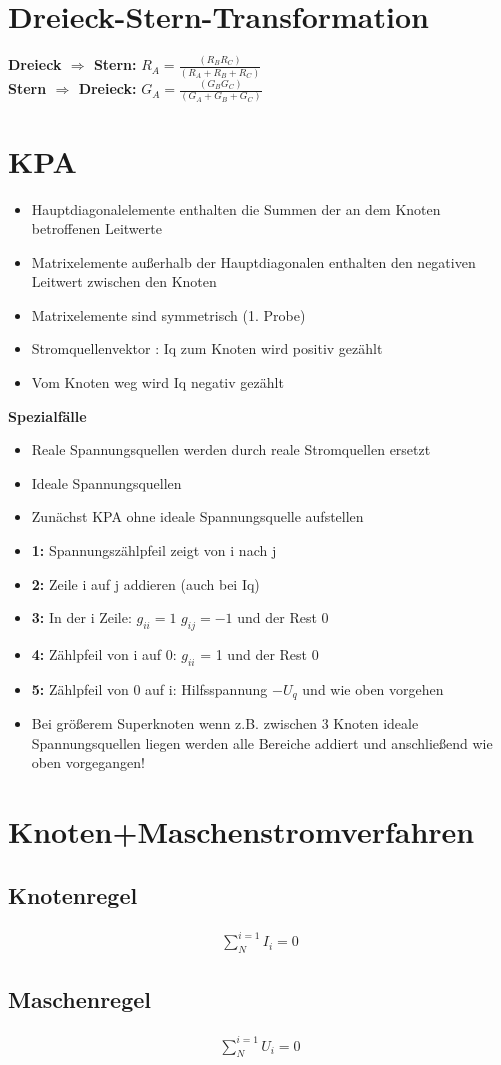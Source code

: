 \documentclass[10pt,a5paper]{article}
\begin{document}
\section{Dreieck-Stern-Transformation}
 
\textbf{Dreieck \ensuremath{\Rightarrow} Stern: } \ensuremath{ R_A=\frac{ (R_B R_C) } { (R_A+R_B+R_C ) } }\\
\textbf{Stern \ensuremath{\Rightarrow} Dreieck: } \ensuremath{ G_A=\frac { (G_B G_C) } {(G_A+G_B+G_C ) } }


\newpage

\section{KPA}
\begin{itemize}
\item Hauptdiagonalelemente enthalten die Summen der an dem Knoten betroffenen Leitwerte 
\item Matrixelemente außerhalb der Hauptdiagonalen enthalten den negativen Leitwert zwischen den Knoten
\item Matrixelemente sind symmetrisch (1. Probe) 
\item Stromquellenvektor : Iq zum Knoten wird positiv gezählt
\item Vom Knoten weg wird Iq negativ gezählt 

\end{itemize}
\textbf{Spezialfälle}
\begin{itemize}
\item Reale Spannungsquellen werden durch reale Stromquellen ersetzt 
\item Ideale Spannungsquellen
\item Zunächst KPA ohne ideale Spannungsquelle aufstellen
\item \textbf{1:} Spannungszählpfeil zeigt von i nach j
\item \textbf{2:} Zeile i auf j addieren (auch bei Iq)
\item \textbf{3:} In der i Zeile: \ensuremath{g_{ii} = 1} \ensuremath{g_{ij}=-1} und der Rest 0
\item \textbf{4:} Zählpfeil von i auf 0: \ensuremath{g_{ii}} = 1 und der Rest 0
\item \textbf{5:} Zählpfeil von 0 auf i: Hilfsspannung \ensuremath{-U_q} und wie oben vorgehen
\item Bei größerem Superknoten wenn z.B. zwischen 3 Knoten ideale Spannungsquellen liegen werden alle Bereiche addiert und anschließend wie oben vorgegangen!

\end{itemize}
\section{Knoten+Maschenstromverfahren}
\subsection{Knotenregel}
\begin{eqnarray}
\sum_{N}^{i=1}I_i=0
\end{eqnarray}
\subsection{Maschenregel}
\begin{eqnarray}
\sum_{N}^{i=1}U_i=0
\end{eqnarray}
\end{document}
